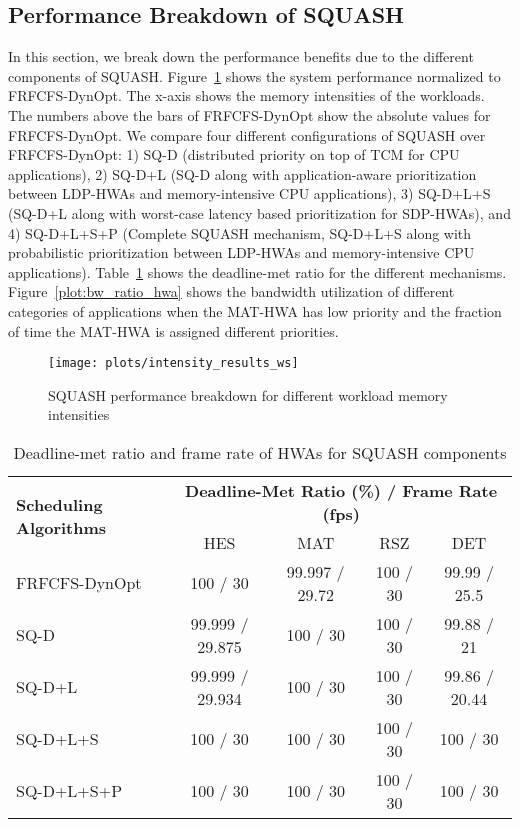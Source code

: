 \documentclass[10pt,letterpaper]{article}
\newcommand{\ldphwas}[0]{LDP-HWAs\xspace}
\newcommand{\sdphwas}[0]{SDP-HWAs\xspace}
\begin{document}
\subsection{Performance Breakdown of SQUASH} \label{sec:intensity} 
In this section, we break down the performance benefits due to the different components
of SQUASH. Figure~\ref{plot:intensity_results} shows the system performance 
normalized to FRFCFS-DynOpt. The x-axis shows the memory intensities of the
workloads. The numbers above the bars of FRFCFS-DynOpt show the absolute values
for FRFCFS-DynOpt. 
We compare four different configurations of SQUASH over
FRFCFS-DynOpt: 1) SQ-D (distributed priority on top of TCM for CPU
applications), 2) SQ-D+L (SQ-D along with application-aware prioritization
between \ldphwas and memory-intensive CPU applications), 3) SQ-D+L+S (SQ-D+L
along with worst-case latency based prioritization for \sdphwas), and 4)
SQ-D+L+S+P (Complete SQUASH mechanism, SQ-D+L+S along with probabilistic prioritization between \ldphwas
and memory-intensive CPU applications). 
Table~\ref{tab:average_hwa_performance2} shows the deadline-met ratio for the
different mechanisms. Figure~\ref{plot:bw_ratio_hwa} shows the bandwidth
utilization of different categories of applications when the MAT-HWA has low
priority and the fraction of time the MAT-HWA is assigned different priorities.



\begin{figure}[h]
  \centering
    \texttt{[image: plots/intensity\_results\_ws]}
\caption{SQUASH performance breakdown for different workload memory intensities}
  \label{plot:intensity_results}
\vspace{-3mm}
\end{figure}




\begin{table}[h]
\footnotesize
\centering
\setlength{\tabcolsep}{.60em}
    \begin{tabular}{lcccc}
      \toprule
\multirow{2}{*}{\textbf{Scheduling Algorithms}} &
      \multicolumn{4}{c}{\textbf{Deadline-Met Ratio (\%) / Frame Rate (fps)}} \\
       & HES & MAT & RSZ & DET \\
      \midrule

    FRFCFS-DynOpt & 100 / 30 & 99.997 / 29.72 & 100 / 30 & 99.99 / 25.5 \\ 
SQ-D & 99.999 / 29.875 &  100 / 30 & 100 / 30 & 99.88 / 21 \\
    SQ-D+L & 99.999 / 29.934 & 100 / 30 & 100 / 30 & 99.86 / 20.44 \\
    SQ-D+L+S & 100 / 30 & 100 / 30 & 100 / 30 & 100 / 30 \\
    SQ-D+L+S+P & 100 / 30 & 100 / 30 & 100 / 30 & 100 / 30 \\

      \bottomrule
    \end{tabular}
\caption{Deadline-met ratio and frame rate of HWAs for SQUASH components}
\label{tab:average_hwa_performance2}\vspace{-2mm}
\end{table}
 
\end{document}
